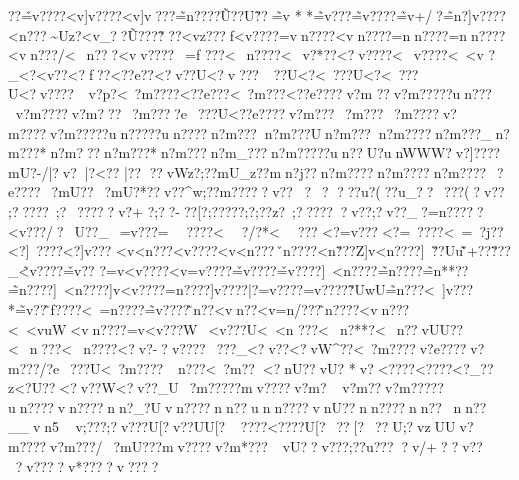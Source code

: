 {{{{{{{{{{{{{{{{{{{{{{{{{{{{{{{{{{{{{{{{{{{{{{{{{{{{{{{{{{{{{{{{{{{{{{{{{{{{{{{{{{{{{{{{{{{{{{{{{{{{{{{{{{{{{{{{{{{{{{{{{{{{{{{{{{{{{{{{{{{{{{{{{{{{{{{{{{{{{{{{{{{{{{{{{{{{{{{{{{{{{{{{{{{{{{{{{{{{{{{{{{{{{{{{{{{{{{{{{{{{{{{{{{{{{{{{{{{{{{{{{{{{{{{{{{{{{{{{{{{{{{{{{{{{{{{{{{{{{{{{{{{{{{{{{{{{{{{{{{{{{{{{{{{{{{{{{{{{{{{{{{{{{{{{{{{{{{{{{{{{{{{{{{{{{{{{{{{{{{{{{{{{{{{{{{{{{{{{{{{{{{{{{{{{{{{{{{{{{{{{{{{{{{{{{{{{{{{{{{{{{{{{{{{{{{{{{{{{{{{{{{{{{{{{{{{{{{{{{{{{{{{{{{{{{{{{{{{{{{{{{{{{{{{{{{{{{{{{{{{{{{{{{{{{{{{{{{{{{{{{{{{{{{{{{{{{{{{{{{{{{{{{{{{{{{{{{{{{{{{{{{{{{{{{{{{{{{{{{{{{{{{{{{{{{{{{{{{{{{{{{{{{{{{{{{{{{{{{{{{{{{{{{{{{{{{{{{{{{{{{{{{{{{{{{{{{{{{{{{{{{{{{{{{{{{{{{{{{{{{{{{{{{{{{{{{{{{{{{{{{{{{{{{{{{{{{{{{{{{{{{{{{{{{{{{{{{{{{{{{{{{{{{{{{{{{{{{{{{{{{{{{{{{{{{{{{{{{{{{{{{{{{{{{{{{{{{{{{{{{{{{{{{{{{{{{{{{{??\v=v????<v]v????<v]v???\~=n????\?\~U??U\?\~??}\~=v
*
*\~=v???\~=v????\~=v+/?\~=n   ?\?]v????\?<n???\?\~}Uz?\?<v_? }?\~U???\?\~???\?<vz???f<v????=vn????<vn????=nn????=nn????<vn???/<~n???<vv????~=f
???<~n????<~v?*??<?v????<~v????<~<v 
?_<?<v ??}<?f ??<??e  ??<?v ??U<?v???\?~??U<?<~???U<?<~???U<?v????~v ?p?<~?m????<??e ???<~?m ???<??e????v?m 
??v?m?????un???v?m????v?m???~?m????e~???U<??e????v?m??? ~?m???~?m????v?m????v?m?????un?????un????n?m???n?m???Un?m???n?m????n?m???_n?m???*n?m???n?m???*n?m???n?m_???n?m?????un??U?unWWW?v?]??? \??mU?-/|?v?|?<??
  |?\??
?{?vWz?;??mU_z??mn?j??n?m????n?m????n?m????~?e????~?mU??~?mU?*??}v??^w;??m?????v???~?
???u?(  ??u_? ?~???(?v??
 ;?????~;?~?????v?+
?;??-??[?;?????;?;??z?~;??????v  ??;?v ??_?=n?????<v???/?~U??_~=v ???=~~????<~~?/?*<~~???
<?=v???<?=~????<~=~?j??<?]~????<?]v???
<v<n???<v\n????<v<n???
\vn????<n\v???Z]v<n????]~\v??Uu\~\v+??\?\v???_\~<v????\v=v?? ?=v<v????<v=v????\v=v????\v=v????]~<n????\~=n????\~=n**??\~=n????]~<n????]v<v????\?=n????\?]v????|?=v????\?=v????\?\~?UwU\~=n ???<~]v???*\~=v??\~f????<~=n????\~=v????\~n??<vn??<v=n/???\~n????<vn???
<~<vu}W<vn????=v<v???W~<v???U<~<n
???<~n?**?<~n??  \?vUU??<~n???<~n????<?v?-?\?v????\?~???_<?v?  ?<?vW^??<~?m????v?e????v?m???/?e~???U<~?m????~n?? ?<~?m??<?nU?? \?vU?
*\?v?  <?\? ???<?\? ???\?<?_??z\?<?U??<?v? ?W<?v??_U~?m?????mv????v?m?v?m??v?m?????un????vn????nn?_?Uvn????nn??unn????vnU}??nn????nn??nn??__vn5
v;???  ;?v???U[?v??UU[?~
???{?<????U[?~ ??[?~??U;?vzUUv?m????v?m???/~?mU???mv????v?m*???~v}U??v???;??u????v/+??v ???v ????v*????v????~
}}}}}}}}}}}}}}}}}}}}}}}}}}}}}}}}}}}}}}}}}}}}}}}}}}}}}}}}}}}}}}}}}}}}}}}}}}}}}}}}}}}}}}}}}}}}}}}}}}}}}}}}}}}}}}}}}}}}}}}}}}}}}}}}}}}}}}}}}}}}}}}}}}}}}}}}}}}}}}}}}}}}}}}}}}}}}}}}}}}}}}}}}}}}}}}}}}}}}}}}}}}}}}}}}}}}}}}}}}}}}}}}}}}}}}}}}}}}}}}}}}}}}}}}}}}}}}}}}}}}}}}}}}}}}}}}}}}}}}}}}}}}}}}}}}}}}}}}}}}}}}}}}}}}}}}}}}}}}}}}}}}}}}}}}}}}}}}}}}}}}}}}}}}}}}}}}}}}}}}}}}}}}}}}}}}}}}}}}}}}}}}}}}}}}}}}}}}}}}}}}}}}}}}}}}}}}}}}}}}}}}}}}}}}}}}}}}}}}}}}}}}}}}}}}}}}}}}}}}}}}}}}}}}}}}}}}}}}}}}}}}}}}}}}}}}}}}}}}}}}}}}}}}}}}}}}}}}}}}}}}}}}}}}}}}}}}}}}}}}}}}}}}}}}}}}}}}}}}}}}}}}}}}}}}}}}}}}}}}}}}}}}}}}}}}}}}}}}}}}}}}}}}}}}}}}}}}}}}}}}}}}}}}}}}}}}}}}}}}}}}}}}}}}}}}}}}}}}}}}}}}}}}}}}}}}}}}}}}}}}}}}}}}}}}}}}}}}}}}}}}}}}}}}}}}}}}}}}}}}}}}}}}}}}}}}}}}}}}}}}}}}}}}}}}}}}}}}}}}}}}}}}}}}}}}}}}}}}}}}}}}}}}}}}}}}}}}}}}}}}}}}}}}}}}
